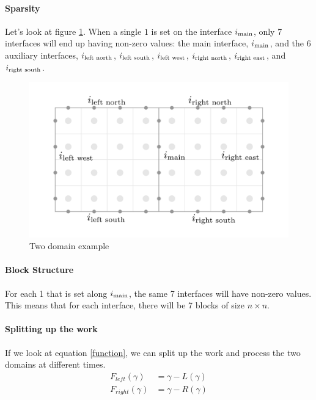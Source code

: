 \documentclass[12pt]{article}
\begin{document}
\paragraph{Sparsity}

Let's look at figure \ref{2domain}.
When a single $1$ is set on the interface $i_{\textnormal{main}}$, only 7 interfaces will end up
having non-zero values: the main interface, $i_{\textnormal{main}}$, and the 6 auxiliary
interfaces, 
$i_{\textnormal{left north}}$, $i_{\textnormal{left south}}$, $i_{\textnormal{left west}}$,
$i_{\textnormal{right north}}$, $i_{\textnormal{right east}}$, and $i_{\textnormal{right south}}$.

\begin{figure}[H]
    \centering
    \includegraphics[width=6in]{images/2domain.pdf}
    \caption{Two domain example}
    \label{2domain}
\end{figure}

\paragraph{Block Structure}

For each 1 that is set along $i_{\textnormal{main}}$, the same 7 interfaces will have non-zero
values. This means that for each interface, there will be 7 blocks of size $n\times n$.

\paragraph{Splitting up the work}

If we look at equation \ref{function}, we can split up the work and process the two domains at
different times.
\begin{align}
    F_{left}(\gamma)&=\gamma-L(\gamma) \label{function_left}\\
    F_{right}(\gamma)&=\gamma-R(\gamma) \label{function_right}
\end{align}
\end{document}
